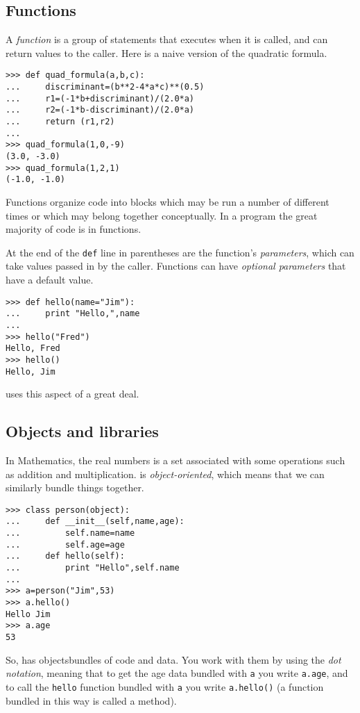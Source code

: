 \subsection{Functions}
A \textit{function} is a group of statements that executes when it is called,
and can return values to the caller.
Here is a naive version of the quadratic formula.
\begin{lstlisting}[style=python]
>>> def quad_formula(a,b,c):
...     discriminant=(b**2-4*a*c)**(0.5)
...     r1=(-1*b+discriminant)/(2.0*a)
...     r2=(-1*b-discriminant)/(2.0*a)
...     return (r1,r2)
... 
>>> quad_formula(1,0,-9)
(3.0, -3.0)
>>> quad_formula(1,2,1)
(-1.0, -1.0)
\end{lstlisting}
Functions organize code into blocks which may be 
run a number of different times or which may belong together conceptually. 
In a \python{} program the great majority of code is in functions. 

At the end of the \lstinline[style=inline]!def! line in parentheses are
the function's \textit{parameters}, which can take values 
passed in by the caller.
Functions can have \textit{optional parameters} that have a default value.
\begin{lstlisting}[style=python]
>>> def hello(name="Jim"):
...     print "Hello,",name
... 
>>> hello("Fred")
Hello, Fred
>>> hello()
Hello, Jim  
\end{lstlisting}
\sage{} uses this aspect of \python{} a great deal.


\subsection{Objects and libraries}
In Mathematics, the real numbers is a set associated with some operations
such as addition and multiplication.
\python{} is \textit{object-oriented}, which means that we can similarly bundle
things together.
\begin{lstlisting}[style=python]
>>> class person(object):
...     def __init__(self,name,age):
...         self.name=name
...         self.age=age
...     def hello(self):
...         print "Hello",self.name
... 
>>> a=person("Jim",53)
>>> a.hello()
Hello Jim
>>> a.age
53  
\end{lstlisting}
So, \python{} has 
objects\Dash bundles of code and data.
You work with them by using the \textit{dot notation}, meaning that
to get the age data bundled with \lstinline[style=inline]!a!
you write \lstinline[style=inline]!a.age!, and to 
call the \lstinline[style=inline]!hello! function bundled
with \lstinline[style=inline]!a! you write
\lstinline[style=inline]!a.hello()! 
(a function bundled in this way is called a method).

